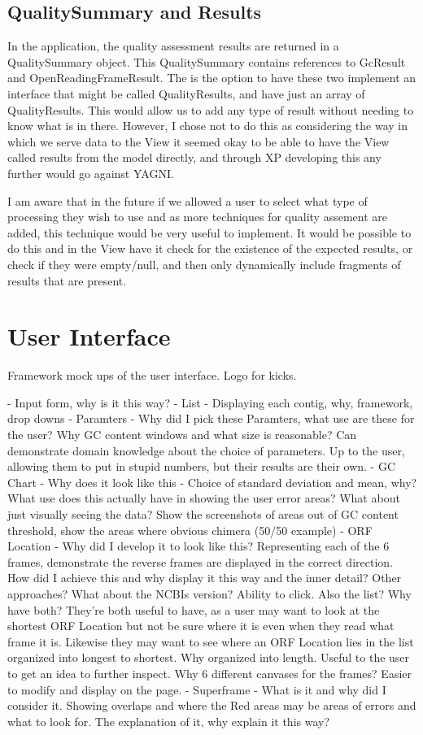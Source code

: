 \subsection{QualitySummary and Results}
In the application, the quality assessment results are returned in a QualitySummary object. This QualitySummary contains references to GcResult and OpenReadingFrameResult. The is the option to have these two implement an interface that might be called QualityResults, and have just an array of QualityResults. This would allow us to add any type of result without needing to know what is in there. However, I chose not to do this as considering the way in which we serve data to the View it seemed okay to be able to have the View called results from the model directly, and through XP developing this any further would go against YAGNI. 

I am aware that in the future if we allowed a user to select what type of processing they wish to use and as more techniques for quality assement are added, this technique would be very useful to implement. It would be possible to do this and in the View have it check for the existence of the expected results, or check if they were empty/null, and then only dynamically include fragments of results that are present. 

\section{User Interface}
Framework mock ups of the user interface. Logo for kicks.

- Input form, why is it this way?
- List - Displaying each contig, why, framework, drop downs
- Paramters - Why did I pick these Paramters, what use are these for the user? Why GC content windows and what size is reasonable? Can demonstrate domain knowledge about the choice of parameters. Up to the user, allowing them to put in stupid numbers, but their results are their own.
- GC Chart - Why does it look like this - Choice of standard deviation and mean, why? What use does this actually have  in showing the user error areas? What about just visually seeing the data? Show the screenshots of areas out of GC content threshold, show the areas where obvious chimera (50/50 example)
- ORF Location - Why did I develop it to look like this? Representing each of the 6 frames, demonstrate the reverse frames are displayed in the correct direction. How did I achieve this and why display it this way and the inner detail? Other approaches? What about the NCBIs version? Ability to click. Also the list? Why have both? They're both useful to have, as a user may want to look at the shortest ORF Location but not be sure where it is even when they read what frame it is. Likewise they may want to see where an ORF Location lies in the list organized into longest to shortest. Why organized into length. Useful to the user to get an idea to further inspect. Why 6 different canvases for the frames? Easier to modify and display on the page.
- Superframe - What is it and why did I consider it. Showing overlaps and where the Red areas may be areas of errors and what to look for. The explanation of it, why explain it this way? 

